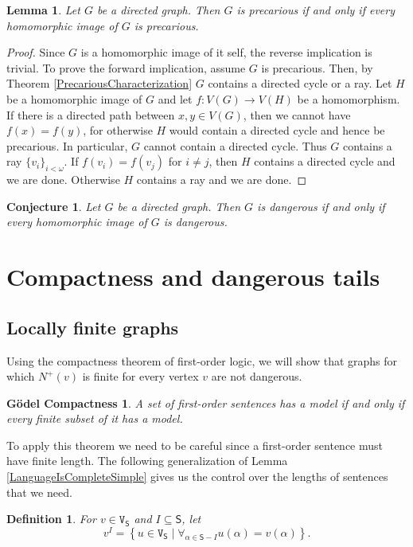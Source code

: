 \documentclass[12pt]{kluwer}
\newtheorem{lem}[thm]{Lemma}
\newtheorem{conj}[thm]{Conjecture}
\newtheorem{defn}{Definition}
\newtheorem*{compactness}{G\"{o}del Compactness}
\theoremstyle{remark}
\def\S{\textsf{S}}
\def\V{\texttt{V}}
\begin{document}
\begin{lem}
Let $G$ be a directed graph.  Then $G$ is precarious if and only if every homomorphic image of $G$ is precarious.
\end{lem}
\begin{proof}
Since $G$ is a homomorphic image of it self, the reverse implication is trivial.  To prove the forward implication, assume $G$ is precarious.  Then, by Theorem \ref{PrecariousCharacterization} $G$ contains a directed cycle or a ray.  Let $H$ be a homomorphic image of $G$ and let $f:V(G) \rightarrow V(H)$ be a homomorphism.  If there is a directed path between $x,y \in V(G)$, then we cannot have $f(x) = f(y)$, for otherwise $H$ would contain a directed cycle and hence be precarious.  In particular, $G$ cannot contain a directed cycle.  Thus $G$ contains a ray $\{v_i\}_{i < \omega}$.  If $f(v_i) = f(v_j)$ for $i \neq j$, then $H$ contains a directed cycle and we are done.  Otherwise $H$ contains a ray and we are done.
\end{proof}

\begin{conj}
Let $G$ be a directed graph.  Then $G$ is dangerous if and only if every homomorphic image of $G$ is dangerous.
\end{conj}

\section{Compactness and dangerous tails}
\label{sec6}

\subsection{Locally finite graphs}
Using the compactness theorem of first-order logic, we will show that graphs for which $N^+(v)$ is finite for every vertex $v$ are not dangerous. 

\begin{compactness}
A set of first-order sentences has a model if and only if every finite subset of it has a model.
\end{compactness}

To apply this theorem we need to be careful since a first-order sentence must have finite length. The following generalization of Lemma \ref{LanguageIsCompleteSimple} gives us the control over the lengths of sentences that we need.

\begin{defn}
For $v \in \V_\S$ and $I \subseteq \S$, let
\[v^I = \left\{u \in  \V_\S \mid \forall_{\alpha \in \S - I} u(\alpha) = v(\alpha)\right\}.\]
\end{defn}
\end{document}
